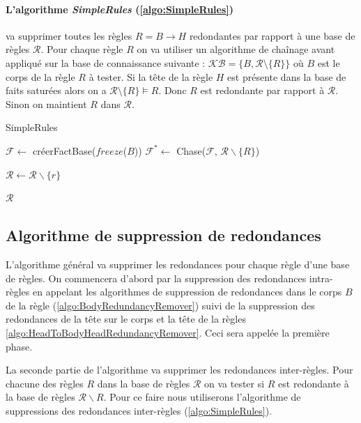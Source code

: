 \paragraph{L'algorithme \textit{SimpleRules} (\ref{algo:SimpleRules})} va supprimer toutes les règles $R = B \rightarrow H$ redondantes par rapport à une base de règles $\mathcal{R}$. Pour chaque règle $R$ on va utiliser un algorithme de chaînage avant appliqué sur la base de connaissance suivante : $\mathcal{KB} = \{B, \mathcal{R} \setminus \{R\}\} $ où $B$ est le corps de la règle $R$ à tester. Si la tête de la règle $H$ est présente dans la base de faits saturées alors on a $\mathcal{R} \setminus \{R\} \models R$. Donc $R$ est redondante par rapport à $\mathcal{R}$. Sinon on maintient $R$ dans $\mathcal{R}$. 
\newline



\begin{algorithm}[H]\label{algo:SimpleRules}
\caption{SimpleRules} %
\SetAlgoLined
\DontPrintSemicolon
\SetAlgoLined
\DontPrintSemicolon
{}
    {
         $\mathcal{F} \gets$ créerFactBase($freeze$($B$)) 
         $\mathcal{F}^* \gets$ Chase($\mathcal{F}$, $\mathcal{R} \backslash \{R\}$)\;
         
        {
            $\mathcal{R} \gets \mathcal{R} \backslash \{r\}$\;
        }
    }
    \Return $\mathcal{R}$
\end{algorithm}



\subsection{Algorithme de suppression de redondances}\label{sec:algo-regles}

\par L'algorithme général va supprimer les redondances pour chaque règle d'une base de règles. On commencera d'abord par la suppression des redondances intra-règles en appelant les algorithmes de suppression de redondances dans le corps $B$ de la règle (\ref{algo:BodyRedundancyRemover}) suivi de la suppression des redondances de la tête sur le corps et la tête de la règles \ref{algo:HeadToBodyHeadRedundancyRemover}. Ceci sera appelée la première phase. 
\par La seconde partie de l'algorithme va supprimer les redondances inter-règles. Pour chacune des règles $R$ dans la base de règles $\mathcal{R}$ on va tester si $R$ est redondante à la base de règles $\mathcal{R} \backslash {R}$. Pour ce faire nous utiliserons l'algorithme de suppressions des redondances inter-règles (\ref{algo:SimpleRules}).


